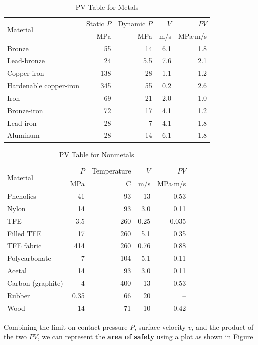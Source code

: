 \documentclass[a4paper,openany]{kaobook}
\begin{document}
\begin{table}[htbp]
\caption{PV Table for Metals}
\centering
\begin{tabular}{lrrrr}
\toprule
\multirow{2}{*}{Material} & Static \(P\) & Dynamic \(P\) & \(V\) & \(PV\)\\
 & MPa & MPa & m/s & MPa\(\cdot\)m/s\\
\midrule
Bronze & 55 & 14 & 6.1 & 1.8\\
Lead-bronze & 24 & 5.5 & 7.6 & 2.1\\
Copper-iron & 138 & 28 & 1.1 & 1.2\\
Hardenable copper-iron & 345 & 55 & 0.2 & 2.6\\
Iron & 69 & 21 & 2.0 & 1.0\\
Bronze-iron & 72 & 17 & 4.1 & 1.2\\
Lead-iron & 28 & 7 & 4.1 & 1.8\\
Aluminum & 28 & 14 & 6.1 & 1.8\\
\bottomrule
\end{tabular}
\end{table}

\begin{table}[htbp]
\caption{PV Table for Nonmetals}
\centering
\begin{tabular}{lrrrr}
\toprule
\multirow{2}{*}{Material} & \(P\) & Temperature & \(V\) & \(PV\)\\
 & MPa & \(^{\circ}\)C & m/s & MPa\(\cdot\)m/s\\
\midrule
Phenolics & 41 & 93 & 13 & 0.53\\
Nylon & 14 & 93 & 3.0 & 0.11\\
TFE & 3.5 & 260 & 0.25 & 0.035\\
Filled TFE & 17 & 260 & 5.1 & 0.35\\
TFE fabric & 414 & 260 & 0.76 & 0.88\\
Polycarbonate & 7 & 104 & 5.1 & 0.11\\
Acetal & 14 & 93 & 3.0 & 0.11\\
Carbon (graphite) & 4 & 400 & 13 & 0.53\\
Rubber & 0.35 & 66 & 20 & --\\
Wood & 14 & 71 & 10 & 0.42\\
\bottomrule
\end{tabular}
\end{table}

Combining the limit on contact pressure \(P\), surface velocity \(v\), and the product of the two \(PV\), we can represent the \textbf{area of safety} using a plot as shown in Figure
\end{document}
